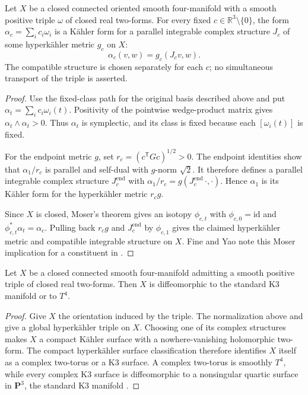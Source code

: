 \begin{corollary}\label{cor:individual-kahler}
Let $X$ be a closed connected oriented smooth four-manifold with a smooth
positive triple $\omega$ of closed real two-forms. For every fixed
$c\in\mathbb R^3\setminus\{0\}$, the form $\alpha_c=\sum_i c_i\omega_i$
is a K\"ahler form for a parallel integrable complex structure $J_c$ of
some hyperk\"ahler metric $g_c$ on $X$:
\[
 \alpha_c(v,w)=g_c(J_cv,w).
\]
The compatible structure is chosen separately for each $c$; no simultaneous
transport of the triple is asserted.
\end{corollary}
\begin{proof}
Use the fixed-class path for the original basis described above and put
$\alpha_t=\sum_i c_i\omega_i(t)$. Positivity of the pointwise wedge-product
matrix gives $\alpha_t\wedge\alpha_t>0$. Thus $\alpha_t$ is symplectic,
and its class is fixed because each $[\omega_i(t)]$ is fixed.

For the endpoint metric $g$, set $r_c=(c^{\mathsf T}Gc)^{1/2}>0$.
The endpoint identities show that $\alpha_1/r_c$ is parallel and self-dual
with $g$-norm $\sqrt2$. It therefore defines a parallel integrable complex
structure $J^{\mathrm{end}}_c$ with
$\alpha_1/r_c=g(J^{\mathrm{end}}_c\,\cdot,\cdot)$.
Hence $\alpha_1$ is its K\"ahler form for the hyperk\"ahler metric $r_cg$.

Since $X$ is closed, Moser's theorem gives an isotopy $\phi_{c,t}$ with
$\phi_{c,0}=\mathrm{id}$ and $\phi_{c,t}^*\alpha_t=\alpha_c$.
Pulling back $r_cg$ and $J^{\mathrm{end}}_c$ by $\phi_{c,1}$ gives the
claimed hyperk\"ahler metric and compatible integrable structure on $X$.
Fine and Yao note this Moser implication for a constituent in
\cite[Section~1]{FineYao2017}.
\end{proof}

\begin{corollary}\label{cor:smooth-type}
Let $X$ be a closed connected smooth four-manifold admitting a smooth
positive triple of closed real two-forms. Then $X$ is diffeomorphic to
the standard K3 manifold or to $T^4$.
\end{corollary}
\begin{proof}
Give $X$ the orientation induced by the triple. The normalization above
and  give a global hyperk\"ahler triple on $X$. Choosing
one of its complex structures makes $X$ a compact K\"ahler surface with
a nowhere-vanishing holomorphic two-form. The compact hyperk\"ahler
surface classification \cite[Section~2, p.~162]{Boyer1988} therefore
identifies $X$ itself as a complex two-torus or a K3 surface. A complex
two-torus is smoothly $T^4$, while every complex K3 surface is
diffeomorphic to a nonsingular quartic surface in $\mathbf P^3$, the
standard K3 manifold \cite[p.~58]{Kodaira1970}.
\end{proof}

